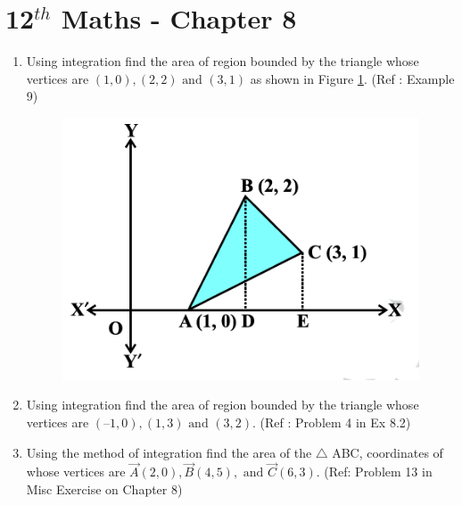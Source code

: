 \documentclass[12pt]{article}
\begin{document}
\section{12$^{th}$ Maths - Chapter 8}
\begin{enumerate}
\item Using integration find the area of region bounded by the triangle whose
	vertices are $(1, 0), (2, 2) \text{ and } (3, 1)$ as shown in Figure \ref{fig:Fig1}. (Ref : Example 9)

\begin{figure}[!h]
	\begin{center}
	    \includegraphics[width=\columnwidth]{./fig1}
	\end{center}
\caption{}
\label{fig:Fig1}
\end{figure}

\item Using integration find the area of region bounded by the triangle whose vertices
	are $(– 1, 0), (1, 3) \text{ and } (3, 2)$. (Ref : Problem 4 in Ex 8.2)

\item Using the method of integration find the area of the $\triangle$ ABC, coordinates of whose vertices are $\vec{A}(2, 0), \vec{B}(4, 5), \text{ and } \vec{C}(6, 3)$. (Ref: Problem 13 in Misc Exercise on Chapter 8)

\end{enumerate}
\end{document}
